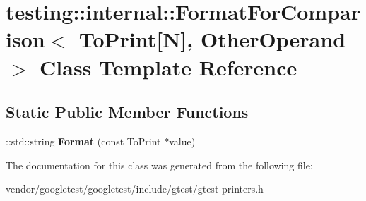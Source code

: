 \hypertarget{classtesting_1_1internal_1_1_format_for_comparison_3_01_to_print[_n]_00_01_other_operand_01_4}{}\section{testing\+:\+:internal\+:\+:Format\+For\+Comparison$<$ To\+Print\mbox{[}N\mbox{]}, Other\+Operand $>$ Class Template Reference}
\label{classtesting_1_1internal_1_1_format_for_comparison_3_01_to_print[_n]_00_01_other_operand_01_4}
\subsection*{Static Public Member Functions}
\begin{DoxyCompactItemize}
\item 
\mbox{\label{classtesting_1_1internal_1_1_format_for_comparison_3_01_to_print[_n]_00_01_other_operand_01_4_a76c526461c8fa7df75f7b32ab889b9e0}} 
\+::std\+::string {\bfseries Format} (const To\+Print $\ast$value)
\end{DoxyCompactItemize}


The documentation for this class was generated from the following file\+:\begin{DoxyCompactItemize}
\item 
vendor/googletest/googletest/include/gtest/gtest-\/printers.\+h\end{DoxyCompactItemize}
